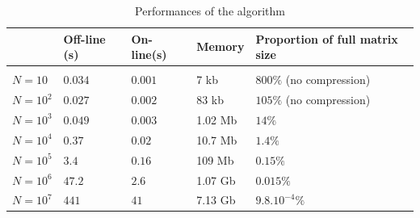 \documentclass{article}
\begin{document}
																																																		
\begin{table}[H]
	\centering
	\begin{tabular}{lllll}
		\centering
		           & \vline\quad Off-line (s) & On-line(s) & Memory  & Proportion of full matrix size \\
		\hline					 				
		           & \vline                   &            &         &                                \\ 
		$N = 10$   & \vline\quad $0.034$      & $0.001$    & 7 kb    & $800\%$ (no compression)       \\
		$N = 10^2$ & \vline\quad $0.027$      & $0.002$    & 83 kb   & $105\%$ (no compression)       \\
		$N = 10^3$ & \vline\quad $0.049$      & $0.003$    & 1.02 Mb & $14\%$                         \\
		$N = 10^4$ & \vline\quad $0.37$       & $0.02$     & 10.7 Mb & $1.4\%$                        \\
		$N = 10^5$ & \vline\quad $3.4$        & $0.16$     & 109 Mb  & $0.15\%$                       \\
		$N = 10^6$ & \vline\quad $47.2$       & $2.6$      & 1.07 Gb & $0.015\%$                      \\
		$N = 10^7$ & \vline\quad $441$        & $41$       & 7.13 Gb & $9.8.10^{-4}\%$                \\		
	\end{tabular}
	\caption{Performances of the algorithm}
	\label{tablePerf}
\end{table}	
																																																		
\end{document}
